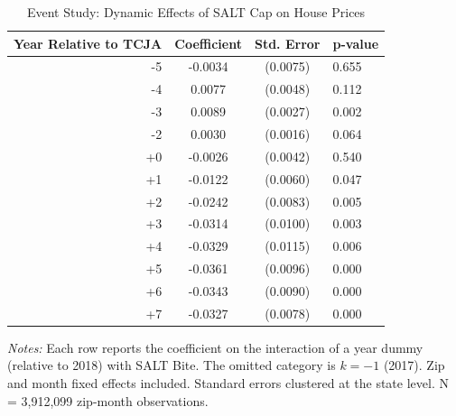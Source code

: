 \begin{table}[H]
\centering
\caption{Event Study: Dynamic Effects of SALT Cap on House Prices}
\label{tab:eventstudy}
\begin{threeparttable}
\begin{tabular}{rccl}
\toprule
Year Relative to TCJA & Coefficient & Std. Error & p-value \\
\midrule
  -5 & -0.0034 & (0.0075) & 0.655 \\
  -4 & 0.0077 & (0.0048) & 0.112 \\
  -3 & 0.0089 & (0.0027) & 0.002 \\
  -2 & 0.0030 & (0.0016) & 0.064 \\
  +0 & -0.0026 & (0.0042) & 0.540 \\
  +1 & -0.0122 & (0.0060) & 0.047 \\
  +2 & -0.0242 & (0.0083) & 0.005 \\
  +3 & -0.0314 & (0.0100) & 0.003 \\
  +4 & -0.0329 & (0.0115) & 0.006 \\
  +5 & -0.0361 & (0.0096) & 0.000 \\
  +6 & -0.0343 & (0.0090) & 0.000 \\
  +7 & -0.0327 & (0.0078) & 0.000 \\
\bottomrule
\end{tabular}
\begin{tablenotes}[flushleft]
\small
\item \textit{Notes:} Each row reports the coefficient on the interaction of a year dummy (relative to 2018) with SALT Bite. The omitted category is $k = -1$ (2017). Zip and month fixed effects included. Standard errors clustered at the state level. N = 3,912,099 zip-month observations.
\end{tablenotes}
\end{threeparttable}
\end{table}
